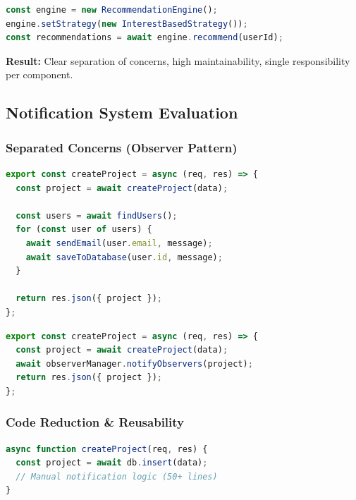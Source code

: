 \documentclass[a4paper,12pt]{report}
\begin{document}
\begin{lstlisting}[language=javascript,style=professional,caption={After: Encapsulated in Recommendation Engine},captionpos=t]
const engine = new RecommendationEngine();
engine.setStrategy(new InterestBasedStrategy());
const recommendations = await engine.recommend(userId);
\end{lstlisting}

\textbf{Result:} Clear separation of concerns, high maintainability, single responsibility per component.

\subsection*{Notification System Evaluation}

\subsubsection*{Separated Concerns (Observer Pattern)}

\begin{lstlisting}[language=javascript,style=professional,caption={Before: Controllers contained notification logic},captionpos=t]
export const createProject = async (req, res) => {
  const project = await createProject(data);
  
  const users = await findUsers();
  for (const user of users) {
    await sendEmail(user.email, message);
    await saveToDatabase(user.id, message);
  }
  
  return res.json({ project });
};
\end{lstlisting}

\begin{lstlisting}[language=javascript,style=professional,caption={After: Notification logic extracted to Observer},captionpos=t]
export const createProject = async (req, res) => {
  const project = await createProject(data);
  await observerManager.notifyObservers(project);
  return res.json({ project });
};
\end{lstlisting}

\subsubsection*{Code Reduction \& Reusability}

\begin{lstlisting}[language=JavaScript,style=professional,caption={Before Patterns - Repetitive Notification Code},captionpos=t]
async function createProject(req, res) {
  const project = await db.insert(data);
  // Manual notification logic (50+ lines)
}
\end{lstlisting}
\end{document}
